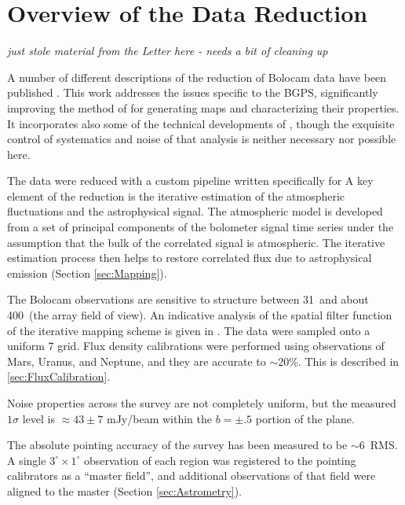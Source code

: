 \documentclass[12pt,preprint]{aastex}
\begin{document}
\section{Overview of the Data Reduction}
\label{sec:Overview}

{\it just stole material from the Letter here - needs a bit of cleaning up}

A number of different descriptions of the reduction of Bolocam data
have been published \citep{laurent05,enoch06,sayers09}.  This work
addresses the issues specific to the BGPS, significantly improving the
method of \citet{enoch06} for generating maps and characterizing their
properties.  It incorporates also some of the technical developments
of \citet{sayers09}, though the exquisite control of systematics and
noise of that analysis is neither necessary nor possible here.

The data were reduced with a custom pipeline written specifically for
A key element of the reduction is the iterative estimation of the
atmospheric fluctuations and the astrophysical signal.  The
atmospheric model is developed from a set of principal components of
the bolometer signal time series under the assumption that the bulk of
the correlated signal is atmospheric.  The iterative estimation
process then helps to restore correlated flux due to astrophysical
emission (Section \ref{sec:Mapping}).

The Bolocam observations are sensitive to structure between 31\arcsec\
and about 400\arcsec\ (the array field of view).  An indicative
analysis of the spatial filter function of the iterative mapping
scheme is given in \citet{enoch06}.  The data were sampled onto a
uniform 7\farcs2 grid.  Flux density calibrations were performed using
observations of Mars, Uranus, and Neptune, and they are accurate to
$\sim$20\%.  This is described in \ref{sec:FluxCalibration}.

Noise properties across the survey are not completely uniform, but the
measured $1\sigma$ level is $\approx43\pm7$ mJy/beam within the
$b=\pm.5$ portion of the plane.

The absolute pointing accuracy of the survey has been measured to be
$\sim$6\arcsec\ RMS.  A single $3^\circ \times 1^\circ$ observation of
each region was registered to the pointing calibrators as a ``master
field'', and additional observations of that field were aligned to the
master (Section \ref{sec:Astrometry}).
\end{document}
